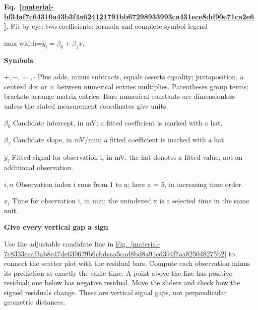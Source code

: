 \documentclass[11pt,a4paper]{article}
\begin{document}
\par\medskip
\noindent\begin{minipage}{\linewidth}
\label{material-bf34af7c64310a43b3f4a624121791bb67298933993ca431ece8dd90e71ca2e6}
\noindent\textbf{Eq.~\ref*{material-bf34af7c64310a43b3f4a624121791bb67298933993ca431ece8dd90e71ca2e6}.} Fit by eye: two coefficients: formula and complete symbol legend\par\nopagebreak
\begin{center}\begin{adjustbox}{max width=\linewidth}$\displaystyle \widehat y_i=\beta_0+\beta_1x_i$\end{adjustbox}\end{center}

\par\noindent\textbf{Symbols}

\par\noindent\textbf{\(+,-,=,\cdot\)} Plus adds, minus subtracts, equals asserts equality; juxtaposition, a centred dot or \ensuremath{\times} between numerical entries multiplies. Parentheses group terms; brackets arrange matrix entries. Bare numerical constants are dimensionless unless the stated measurement coordinates give units.

\par\noindent\textbf{\(\beta_0\)} Candidate intercept, in mV; a fitted coefficient is marked with a hat.

\par\noindent\textbf{\(\beta_1\)} Candidate slope, in mV/min; a fitted coefficient is marked with a hat.

\par\noindent\textbf{\(\widehat y_i\)} Fitted signal for observation i, in mV; the hat denotes a fitted value, not an additional observation.

\par\noindent\textbf{\(i,n\)} Observation index i runs from 1 to n; here n = 5, in increasing time order.

\par\noindent\textbf{\(x_i\)} Time for observation i, in min; the unindexed x is a selected time in the same unit.

\end{minipage}\par
\medskip

\textbf{Give every vertical gap a sign}


Use the adjustable candidate line in \hyperref[material-7c8333ecaf3ab8e47de639679b6cbdcaa5cad8bd8a91cd394f7aa825048275b2]{Fig.~\ref*{material-7c8333ecaf3ab8e47de639679b6cbdcaa5cad8bd8a91cd394f7aa825048275b2}} to connect the scatter plot with the residual bars. Compute each observation minus its prediction at exactly the same time. A point above the line has positive residual; one below has negative residual. Move the sliders and check how the signed residuals change. These are vertical signal gaps, not perpendicular geometric distances.
\end{document}
